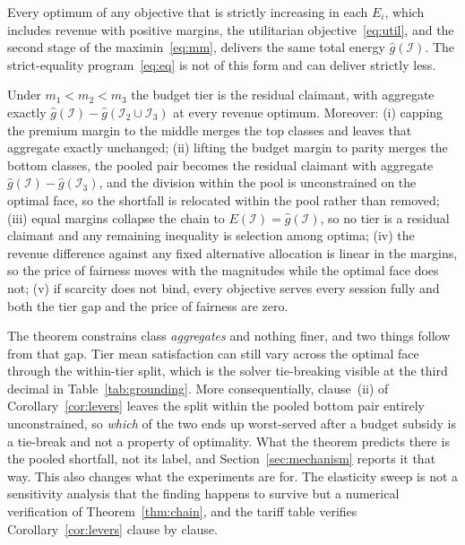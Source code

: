 \documentclass[manuscript, screen, review, anonymous]{acmart}
\begin{document}
\begin{theorem}[Totals]\label{thm:base}
Every optimum of any objective that is strictly increasing in each $E_i$, which includes revenue with positive margins, the utilitarian objective~\eqref{eq:util}, and the second stage of the maximin~\eqref{eq:mm}, delivers the same total energy $\hat g(\mathcal{I})$. The strict-equality program~\eqref{eq:eq} is not of this form and can deliver strictly less.
\end{theorem}

\begin{corollary}[Levers]\label{cor:levers}
Under $m_1<m_2<m_3$ the budget tier is the residual claimant, with aggregate exactly $\hat g(\mathcal{I})-\hat g(\mathcal{I}_2\cup\mathcal{I}_3)$ at every revenue optimum. Moreover: (i) capping the premium margin to the middle merges the top classes and leaves that aggregate exactly unchanged; (ii) lifting the budget margin to parity merges the bottom classes, the pooled pair becomes the residual claimant with aggregate $\hat g(\mathcal{I})-\hat g(\mathcal{I}_3)$, and the division within the pool is unconstrained on the optimal face, so the shortfall is relocated within the pool rather than removed; (iii) equal margins collapse the chain to $E(\mathcal{I})=\hat g(\mathcal{I})$, so no tier is a residual claimant and any remaining inequality is selection among optima; (iv) the revenue difference against any fixed alternative allocation is linear in the margins, so the price of fairness moves with the magnitudes while the optimal face does not; (v) if scarcity does not bind, every objective serves every session fully and both the tier gap and the price of fairness are zero.
\end{corollary}

The theorem constrains class \emph{aggregates} and nothing finer, and two things follow from that gap. Tier mean satisfaction can still vary across the optimal face through the within-tier split, which is the solver tie-breaking visible at the third decimal in Table~\ref{tab:grounding}. More consequentially, clause~(ii) of Corollary~\ref{cor:levers} leaves the split within the pooled bottom pair entirely unconstrained, so \emph{which} of the two ends up worst-served after a budget subsidy is a tie-break and not a property of optimality. What the theorem predicts there is the pooled shortfall, not its label, and Section~\ref{sec:mechanism} reports it that way. This also changes what the experiments are for. The elasticity sweep is not a sensitivity analysis that the finding happens to survive but a numerical verification of Theorem~\ref{thm:chain}, and the tariff table verifies Corollary~\ref{cor:levers} clause by clause.
\end{document}
